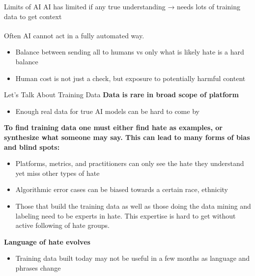 \documentclass[nobackground,dvipsnames,table]{beamer}
\begin{document}
\begin{frame}{Limits of AI}
    \small
    AI has limited if any true understanding → needs lots of training data to get context\\~\\

    Often AI cannot act in a fully automated way.
    \begin{itemize}
        \item Balance between sending all to humans vs only what is likely hate is a hard balance
        \item Human cost is not just a check, but exposure to potentially harmful content
    \end{itemize}
\end{frame}

\begin{frame}{Let's Talk About Training Data}
    \footnotesize
    \textbf{Data is rare in broad scope of platform}
    \begin{itemize}
        \item Enough real data for true AI models can be hard to come by
    \end{itemize}
    
    \textbf{To find training data one must either find hate as examples, or synthesize what someone may say.  This can lead to many forms of bias and blind spots:}
    \begin{itemize}
        \item Platforms, metrics, and practitioners can only see the hate they understand yet miss other types of hate
        \item Algorithmic error cases can be biased towards a certain race, ethnicity
        \item Those that build the training data as well as those doing the data mining and labeling need to be experts in hate. This expertise is hard to get without active following of hate groups.
    \end{itemize}
    
    \textbf{Language of hate evolves}
    \begin{itemize}
        \item Training data built today may not be useful in a few months as language and phrases change
    \end{itemize}
\end{frame}
\end{document}
